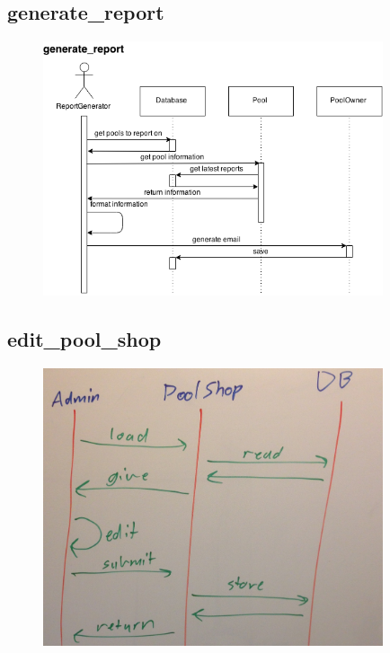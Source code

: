 \subsection{generate\_report}
\begin{figure}[!ht]
\begin{center}
	\includegraphics[width=10cm]{images/generate_report}
	\caption{}
\end{center}
\end{figure}
\FloatBarrier

\subsection{edit\_pool\_shop}
\begin{figure}[!ht]
\begin{center}
	\includegraphics[width=10cm]{images/edit_pool_shop}
	\caption{}
\end{center}
\end{figure}
\FloatBarrier

